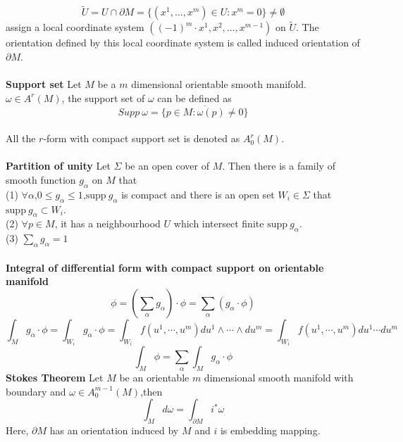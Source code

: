 \documentclass{article}
\begin{document}
\[\tilde{U} = U \cap \partial M = \{(x^1,\ldots,x^m) \in U:x^m=0 \} \neq \emptyset\]
assign a local coordinate system $((-1)^m \cdot x^1,x^2,\ldots,x^{m-1})$ on $\tilde{U}$. The orientation defined by this local coordinate system is called induced orientation of $\partial M$.\\ \\
\textbf{Support set} Let $M$ be a $m$ dimensional orientable smooth manifold. $\omega \in A^r(M)$, the support set of $\omega$ can be defined as
\[Supp \ \omega = \overline {\{ p \in M :\omega(p) \neq 0\}}\]\\
All the $r$-form with compact support set is denoted as $A^r_0(M)$.\\ \\
\textbf{Partition of unity} Let $\Sigma$ be an open cover of $M$. Then there is a family of smooth function $g_{\alpha}$ on $M$ that\\
(1) $\forall \alpha$,$0 \leq g_{\alpha} \leq 1$,$\mathrm{supp} \ g_{\alpha}$ is compact and there is an open set $W_i \in  \Sigma$ that $\mathrm{supp} \  g_{\alpha} \subset W_i$.\\
(2) $\forall p \in M$, it has a neighbourhood $U$ which intersect finite $\mathrm{supp} \ g_{\alpha}$.\\
(3) $\sum_{\alpha} g_{\alpha} = 1$\\ \\
\textbf{Integral of differential form with compact support on orientable manifold}\\
\[\phi = (\sum_{\alpha} g_{\alpha})\cdot \phi = \sum_{\alpha} (g_{\alpha} \cdot \phi)\]
\[\int_{M} g_{\alpha} \cdot \phi = \int_{W_i} g_{\alpha} \cdot \phi = \int_{W_i} f(u^1,\cdots,u^m) du^1 \wedge \cdots \wedge du^m = \int_{W_i} f(u^1,\cdots,u^m) du^1 \cdots du^m\]
\[\int_{M} \phi = \sum_{\alpha} \int_{M} g_{\alpha} \cdot \phi\]
\textbf{Stokes Theorem} Let $M$ be an orientable $m$ dimensional smooth manifold with boundary and $\omega \in A_0^{m-1}(M)$,then
\[\int_{M} d\omega = \int_{\partial M} i^* \omega\]
Here, $\partial M$ has an orientation induced by $M$ and $i$ is  embedding mapping.
\end{document}
